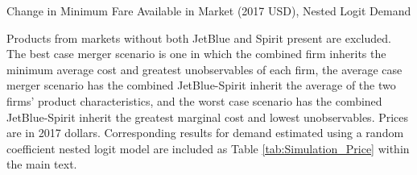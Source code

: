\documentclass{article}
\begin{document}
\begin{appendices}
 \begin{table}
        \caption{Change in Minimum Fare Available in Market (2017 USD), Nested Logit Demand}
        \label{tab:MinimumPrice_NestedLogit}
                \vspace{-15mm}
        \begin{center}
            
        \end{center}
        \vspace{-5mm}
        \footnotesize{Products from markets without both JetBlue and Spirit present are excluded. The best case merger scenario is one in which the combined firm inherits the minimum average cost and greatest unobservables of each firm, the average case merger scenario has the combined JetBlue-Spirit inherit the average of the two firms' product characteristics, and the worst case scenario has the combined JetBlue-Spirit inherit the greatest marginal cost and lowest unobservables. Prices are in 2017 dollars. Corresponding results for demand estimated using a random coefficient nested logit model are included as Table \ref{tab:Simulation_Price} within the main text.}
    \end{table}    
\FloatBarrier



\end{appendices}
	
\end{document}
